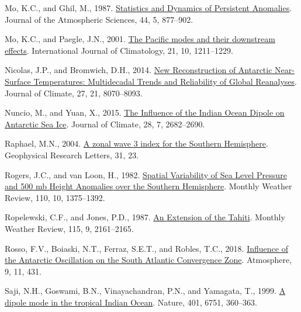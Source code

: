 \documentclass[12pt,oneside]{reedthesis}
\newlength{\cslhangindent}
\newenvironment{CSLReferences}[2] %
 {%
  \setlength{\parindent}{0pt}
  \ifodd #1 \everypar{\setlength{\hangindent}{\cslhangindent}}\ignorespaces\fi
  \ifnum #2 > 0
  \setlength{\parskip}{#2\baselineskip}
  \fi
 }%
 {}
\begin{document}
\begin{CSLReferences}{1}{0}
\leavevmode{}%
Mo, K.C., and Ghil, M., 1987. \href{https://doi.org/10.1175/1520-0469(1987)044\%3C0877:SADOPA\%3E2.0.CO;2}{Statistics and {Dynamics} of {Persistent Anomalies}}. Journal of the Atmospheric Sciences, 44, 5, 877--902.

\leavevmode{}%
Mo, K.C., and Paegle, J.N., 2001. \href{https://doi.org/10.1002/joc.685}{The {Pacific} modes and their downstream effects}. International Journal of Climatology, 21, 10, 1211--1229.

\leavevmode{}%
Nicolas, J.P., and Bromwich, D.H., 2014. \href{https://doi.org/10.1175/JCLI-D-13-00733.1}{New {Reconstruction} of {Antarctic Near-Surface Temperatures}: {Multidecadal Trends} and {Reliability} of {Global Reanalyses}}. Journal of Climate, 27, 21, 8070--8093.

\leavevmode{}%
Nuncio, M., and Yuan, X., 2015. \href{https://doi.org/10.1175/JCLI-D-14-00390.1}{The {Influence} of the {Indian Ocean Dipole} on {Antarctic Sea Ice}}. Journal of Climate, 28, 7, 2682--2690.

\leavevmode{}%
Raphael, M.N., 2004. \href{https://doi.org/10.1029/2004GL020365}{A zonal wave 3 index for the {Southern Hemisphere}}. Geophysical Research Letters, 31, 23.

\leavevmode{}%
Rogers, J.C., and van Loon, H., 1982. \href{https://doi.org/10.1175/1520-0493(1982)110\%3C1375:SVOSLP\%3E2.0.CO;2}{Spatial {Variability} of {Sea Level Pressure} and 500 mb {Height Anomalies} over the {Southern Hemisphere}}. Monthly Weather Review, 110, 10, 1375--1392.

\leavevmode{}%
Ropelewski, C.F., and Jones, P.D., 1987. \href{https://doi.org/10.1175/1520-0493(1987)115\%3C2161:AEOTTS\%3E2.0.CO;2}{An {Extension} of the {Tahiti}}. Monthly Weather Review, 115, 9, 2161--2165.

\leavevmode{}%
Rosso, F.V., Boiaski, N.T., Ferraz, S.E.T., and Robles, T.C., 2018. \href{https://doi.org/10.3390/atmos9110431}{Influence of the {Antarctic Oscillation} on the {South Atlantic Convergence Zone}}. Atmosphere, 9, 11, 431.

\leavevmode{}%
Saji, N.H., Goswami, B.N., Vinayachandran, P.N., and Yamagata, T., 1999. \href{https://doi.org/10.1038/43854}{A dipole mode in the tropical {Indian Ocean}}. Nature, 401, 6751, 360--363.


\end{CSLReferences}
\end{document}

